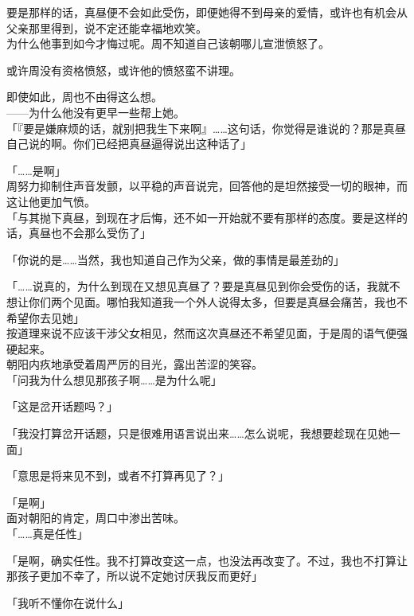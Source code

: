 要是那样的话，真昼便不会如此受伤，即便她得不到母亲的爱情，或许也有机会从父亲那里得到，说不定还能幸福地欢笑。\\

为什么他事到如今才悔过呢。周不知道自己该朝哪儿宣泄愤怒了。

或许周没有资格愤怒，或许他的愤怒蛮不讲理。

即使如此，周也不由得这么想。\\

——为什么他没有更早一些帮上她。\\

「『要是嫌麻烦的话，就别把我生下来啊』……这句话，你觉得是谁说的？那是真昼自己说的啊。你们已经把真昼逼得说出这种话了」

「……是啊」\\

周努力抑制住声音发颤，以平稳的声音说完，回答他的是坦然接受一切的眼神，而这让他更加气愤。\\

「与其抛下真昼，到现在才后悔，还不如一开始就不要有那样的态度。要是这样的话，真昼也不会那么受伤了」

「你说的是……当然，我也知道自己作为父亲，做的事情是最差劲的」

「……说真的，为什么到现在又想见真昼了？要是真昼见到你会受伤的话，我就不想让你们两个见面。哪怕我知道我一个外人说得太多，但要是真昼会痛苦，我也不希望你去见她」\\

按道理来说不应该干涉父女相见，然而这次真昼还不希望见面，于是周的语气便强硬起来。\\

朝阳内疚地承受着周严厉的目光，露出苦涩的笑容。\\

「问我为什么想见那孩子啊……是为什么呢」

「这是岔开话题吗？」

「我没打算岔开话题，只是很难用语言说出来……怎么说呢，我想要趁现在见她一面」

「意思是将来见不到，或者不打算再见了？」

「是啊」\\

面对朝阳的肯定，周口中渗出苦味。\\

「……真是任性」

「是啊，确实任性。我不打算改变这一点，也没法再改变了。不过，我也不打算让那孩子更加不幸了，所以说不定她讨厌我反而更好」

「我听不懂你在说什么」

